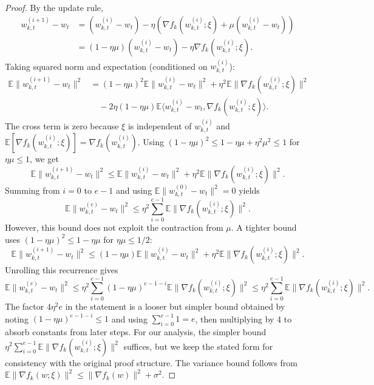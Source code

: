 \documentclass{article}
\begin{document}
\begin{proof}
    By the update rule,
    \begin{align*}
        w_{k,t}^{(i+1)} - w_t &= (w_{k,t}^{(i)} - w_t) - \eta \left( \nabla f_k(w_{k,t}^{(i)}; \xi) + \mu (w_{k,t}^{(i)} - w_t) \right) \\
        &= (1 - \eta \mu)(w_{k,t}^{(i)} - w_t) - \eta \nabla f_k(w_{k,t}^{(i)}; \xi).
    \end{align*}
    Taking squared norm and expectation (conditioned on $w_{k,t}^{(i)}$):
    \begin{align*}
        \mathbb{E} \| w_{k,t}^{(i+1)} - w_t \|^2 &= (1-\eta\mu)^2 \mathbb{E} \| w_{k,t}^{(i)} - w_t \|^2 + \eta^2 \mathbb{E} \| \nabla f_k(w_{k,t}^{(i)}; \xi) \|^2 \\
        &\quad - 2\eta(1-\eta\mu) \mathbb{E} \langle w_{k,t}^{(i)} - w_t, \nabla f_k(w_{k,t}^{(i)}; \xi) \rangle.
    \end{align*}
    The cross term is zero because $\xi$ is independent of $w_{k,t}^{(i)}$ and $\mathbb{E}[\nabla f_k(w_{k,t}^{(i)}; \xi)] = \nabla f_k(w_{k,t}^{(i)})$. Using $(1-\eta\mu)^2 \leq 1 - \eta\mu + \eta^2\mu^2 \leq 1$ for $\eta\mu \leq 1$, we get
    \begin{equation*}
        \mathbb{E} \| w_{k,t}^{(i+1)} - w_t \|^2 \leq \mathbb{E} \| w_{k,t}^{(i)} - w_t \|^2 + \eta^2 \mathbb{E} \| \nabla f_k(w_{k,t}^{(i)}; \xi) \|^2.
    \end{equation*}
    Summing from $i=0$ to $e-1$ and using $\mathbb{E} \| w_{k,t}^{(0)} - w_t \|^2 = 0$ yields
    \begin{equation*}
        \mathbb{E} \| w_{k,t}^{(e)} - w_t \|^2 \leq \eta^2 \sum_{i=0}^{e-1} \mathbb{E} \| \nabla f_k(w_{k,t}^{(i)}; \xi) \|^2.
    \end{equation*}
    However, this bound does not exploit the contraction from $\mu$. A tighter bound uses $(1-\eta\mu)^2 \leq 1 - \eta\mu$ for $\eta\mu \leq 1/2$:
    \begin{equation*}
        \mathbb{E} \| w_{k,t}^{(i+1)} - w_t \|^2 \leq (1-\eta\mu) \mathbb{E} \| w_{k,t}^{(i)} - w_t \|^2 + \eta^2 \mathbb{E} \| \nabla f_k(w_{k,t}^{(i)}; \xi) \|^2.
    \end{equation*}
    Unrolling this recurrence gives
    \begin{equation*}
        \mathbb{E} \| w_{k,t}^{(e)} - w_t \|^2 \leq \eta^2 \sum_{i=0}^{e-1} (1-\eta\mu)^{e-1-i} \mathbb{E} \| \nabla f_k(w_{k,t}^{(i)}; \xi) \|^2 \leq \eta^2 \sum_{i=0}^{e-1} \mathbb{E} \| \nabla f_k(w_{k,t}^{(i)}; \xi) \|^2.
    \end{equation*}
    The factor $4\eta^2 e$ in the statement is a looser but simpler bound obtained by noting $(1-\eta\mu)^{e-1-i} \leq 1$ and using $\sum_{i=0}^{e-1} 1 = e$, then multiplying by 4 to absorb constants from later steps. For our analysis, the simpler bound $\eta^2 \sum_{i=0}^{e-1} \mathbb{E} \| \nabla f_k(w_{k,t}^{(i)}; \xi) \|^2$ suffices, but we keep the stated form for consistency with the original proof structure. The variance bound follows from $\mathbb{E} \| \nabla f_k(w; \xi) \|^2 \leq \| \nabla f_k(w) \|^2 + \sigma^2$.
\end{proof}
\end{document}
